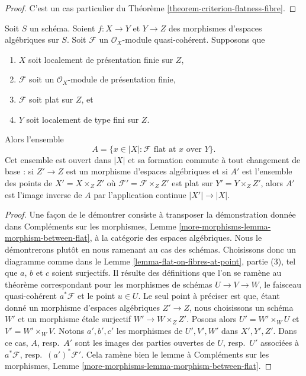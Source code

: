 \begin{proof}
C'est un cas particulier du
Théorème \ref{theorem-criterion-flatness-fibre}.
\end{proof}

\begin{lemma}
\label{lemma-base-change-criterion-flatness-fibre}
Soit $S$ un schéma. Soient $f : X \to Y$ et $Y \to Z$ des morphismes
d'espaces algébriques sur $S$. Soit $\mathcal{F}$ un
$\mathcal{O}_X$-module quasi-cohérent.
Supposons que
\begin{enumerate}
\item $X$ soit localement de présentation finie sur $Z$,
\item $\mathcal{F}$ soit un $\mathcal{O}_X$-module de présentation finie,
\item $\mathcal{F}$ soit plat sur $Z$, et
\item $Y$ soit localement de type fini sur $Z$.
\end{enumerate}
Alors l'ensemble
$$
A = \{x \in |X| : \mathcal{F} \text{ flat at }x \text{ over }Y\}.
$$
Cet ensemble est ouvert dans $|X|$ et sa formation commute à tout changement de base :
si $Z' \to Z$ est un morphisme d'espaces algébriques et si $A'$ est l'ensemble des
points de $X' = X \times_Z Z'$ où $\mathcal{F}' = \mathcal{F} \times_Z Z'$
est plat sur $Y' = Y \times_Z Z'$, alors $A'$ est l'image inverse de
$A$ par l'application continue $|X'| \to |X|$.
\end{lemma}

\begin{proof}
Une façon de le démontrer consiste à transposer la démonstration donnée dans
Compléments sur les morphismes, Lemme \ref{more-morphisms-lemma-morphism-between-flat},
à la catégorie des espaces algébriques. Nous le démontrerons plutôt
en nous ramenant au cas des schémas. Choisissons donc un diagramme comme dans le
Lemme \ref{lemma-flat-on-fibres-at-point}, partie (3),
tel que $a$, $b$ et $c$ soient surjectifs.
Il résulte des définitions que l'on se ramène au
théorème correspondant pour les morphismes de schémas
$U \to V \to W$, le faisceau quasi-cohérent $a^*\mathcal{F}$
et le point $u \in U$. Le seul point à préciser est que,
étant donné un morphisme d'espaces algébriques $Z' \to Z$, nous choisissons un schéma
$W'$ et un morphisme étale surjectif $W' \to W \times_Z Z'$.
Posons alors $U' = W' \times_W U$ et $V' = W' \times_W V$.
Notons $a', b', c'$ les morphismes de $U', V', W'$ dans
$X', Y', Z'$. Dans ce cas, $A$, resp.\ $A'$ sont les images des parties
ouvertes de $U$, resp.\ $U'$ associées à
$a^*\mathcal{F}$, resp.\ $(a')^*\mathcal{F}'$.
Cela ramène bien le lemme à
Compléments sur les morphismes, Lemme \ref{more-morphisms-lemma-morphism-between-flat}.
\end{proof}

